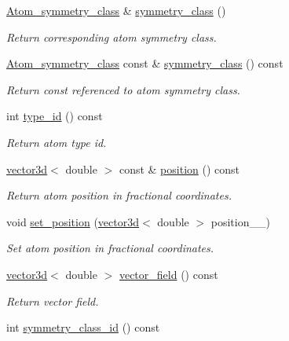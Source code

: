 \begin{DoxyCompactItemize}
\hyperlink{classsirius_1_1_atom__symmetry__class}{Atom\+\_\+symmetry\+\_\+class} \& \hyperlink{classsirius_1_1_atom_a35b6a5e198f42cd7f386b14305f2db71}{symmetry\+\_\+class} ()
\begin{DoxyCompactList}\small\item\em Return corresponding atom symmetry class. \end{DoxyCompactList}\item 
\hyperlink{classsirius_1_1_atom__symmetry__class}{Atom\+\_\+symmetry\+\_\+class} const \& \hyperlink{classsirius_1_1_atom_ae6edd292de11c620d6ca166f45a6a0b1}{symmetry\+\_\+class} () const 
\begin{DoxyCompactList}\small\item\em Return const referenced to atom symmetry class. \end{DoxyCompactList}\item 
int \hyperlink{classsirius_1_1_atom_acf4b3aab528fab8f3295b80e8119f993}{type\+\_\+id} () const 
\begin{DoxyCompactList}\small\item\em Return atom type id. \end{DoxyCompactList}\item 
\hyperlink{classgeometry3d_1_1vector3d}{vector3d}$<$ double $>$ const \& \hyperlink{classsirius_1_1_atom_a65da8571a8f4d5eba02e985507560646}{position} () const 
\begin{DoxyCompactList}\small\item\em Return atom position in fractional coordinates. \end{DoxyCompactList}\item 
void \hyperlink{classsirius_1_1_atom_a2623365f35c9de31805fa1e6562ae25b}{set\+\_\+position} (\hyperlink{classgeometry3d_1_1vector3d}{vector3d}$<$ double $>$ position\+\_\+\+\_\+)
\begin{DoxyCompactList}\small\item\em Set atom position in fractional coordinates. \end{DoxyCompactList}\item 
\hyperlink{classgeometry3d_1_1vector3d}{vector3d}$<$ double $>$ \hyperlink{classsirius_1_1_atom_a2fd83733c8fbd4ed9702fbb1cffad919}{vector\+\_\+field} () const 
\begin{DoxyCompactList}\small\item\em Return vector field. \end{DoxyCompactList}\item 
int \hyperlink{classsirius_1_1_atom_ace1dee3d4d39074762aac5b9103e38d1}{symmetry\+\_\+class\+\_\+id} () const 

\end{DoxyCompactItemize}

